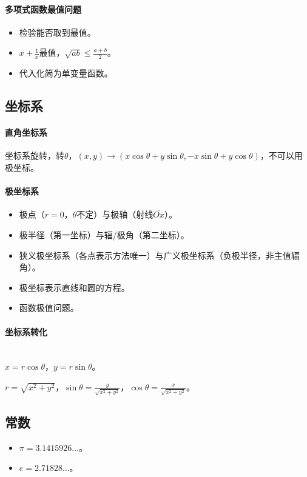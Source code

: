 \documentclass[
12pt, %
a4paper, 
oneside, %
headinclude,footinclude, %
]{scrartcl}
\begin{document}
\paragraph{多项式函数最值问题}
\begin{itemize}
\item 检验能否取到最值。
\item $ x + \frac{1}{x} $最值，$ \sqrt{ab}\leq \frac{a + b}{2}$。
\item 代入化简为单变量函数。
\end{itemize}
\subsection{坐标系}
\paragraph{直角坐标系}
坐标系旋转，转$ \theta $，$ (x, y) \to (x\cos\theta + y\sin\theta, -x\sin\theta + y\cos\theta) $，不可以用极坐标。
\paragraph{极坐标系}
\begin{itemize}
\item 极点（$ r = 0 $，$ \theta $不定）与极轴（射线$ \overline{Ox} $）。
\item 极半径（第一坐标）与辐/极角（第二坐标）。
\item 狭义极坐标系（各点表示方法唯一）与广义极坐标系（负极半径，非主值辐角）。
\item 极坐标表示直线和圆的方程。
\item 函数极值问题。
\end{itemize}
\paragraph{坐标系转化}~\\

$ x = r\cos\theta $，$ y = r\sin\theta $。

$ r = \sqrt{x^2 + y^2} $，$ \sin\theta = \frac{y}{\sqrt{x^2 + y^2}} $，$ \cos\theta = \frac{x}{\sqrt{x^2 + y^2}} $。
\subsection{常数}
\begin{itemize}
\item $ \pi = 3.1415926 \dots $。
\item $ e = 2.71828 \dots $。
\end{itemize}
\end{document}
